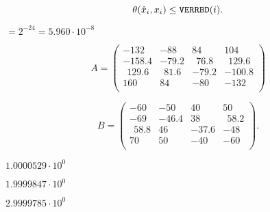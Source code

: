 {\newpage\clearpage
{}%
\begin{displaymath}
\theta(\hat{x}_i, x_i) \leq {\tt VERRBD}(i) .
\end{displaymath}%
\lthtmldisplayZ
\lthtmlcheckvsize\clearpage}

{\newpage\clearpage
{}%
$ = 2^{-24} = 5.960  \cdot 10^{-8}$%
\lthtmlinlinemathZ
\lthtmlcheckvsize\clearpage}

{\newpage\clearpage
{}%
\begin{displaymath}
A = \left( \begin{array}{cccc}
           -132~~   &   -88~~  &    84    &    104     \\
           -158.4   &   -79.2  &  ~~76.8  &  ~~129.6   \\
          ~~129.6   &  ~~81.6  &   -79.2  &   -100.8   \\
            160     &    84    &   -80~~  &   -132~~   \\
           \end{array} \right )
\end{displaymath}%
\lthtmldisplayZ
\lthtmlcheckvsize\clearpage}

{\newpage\clearpage
{}%
\begin{displaymath}
B = \left( \begin{array}{cccc}
           -60~~  &  -50~~  &   40   &   50   \\
           -69~~  &  -46.4  &   38   & ~~58.2 \\
          ~~58.8  &   46    &  -37.6 &  -48~~ \\
            70    &   50    &  -40~~ &  -60~~ \\
           \end{array} \right ).
\end{displaymath}%
\lthtmldisplayZ
\lthtmlcheckvsize\clearpage}

{\newpage\clearpage
{}%
$1.0000529 \cdot 10^0~~$%
\lthtmlinlinemathZ
\lthtmlcheckvsize\clearpage}

{\newpage\clearpage
{}%
$1.9999847 \cdot 10^0~~$%
\lthtmlinlinemathZ
\lthtmlcheckvsize\clearpage}

{\newpage\clearpage
{}%
$2.9999785 \cdot 10^0~~$%
\lthtmlinlinemathZ
\lthtmlcheckvsize\clearpage}


